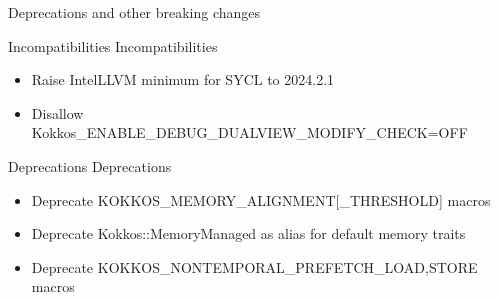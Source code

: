
\begin{frame}[fragile]

  {\Huge Deprecations and other breaking changes}

  \vspace{10pt}

\end{frame}


\begin{frame}[fragile]{Incompatibilities}
  Incompatibilities
  \begin{itemize}
    \item Raise IntelLLVM minimum for SYCL to 2024.2.1
    \item Disallow Kokkos\_ENABLE\_DEBUG\_DUALVIEW\_MODIFY\_CHECK=OFF
  \end{itemize}
\end{frame}

\begin{frame}[fragile]{Deprecations}
  Deprecations
  \begin{itemize}
    \item Deprecate KOKKOS\_MEMORY\_ALIGNMENT[\_THRESHOLD] macros
    \item Deprecate Kokkos::MemoryManaged as alias for default memory traits
    \item Deprecate KOKKOS\_NONTEMPORAL\_PREFETCH\_{LOAD,STORE} macros
  \end{itemize}
\end{frame}

